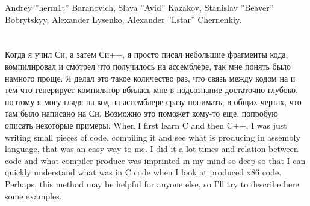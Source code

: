 \documentclass[11pt,a4paper,oneside]{book}
\begin{document}
{Andrey ''herm1t'' Baranovich, Slava ''Avid'' Kazakov, Stanislav ''Beaver'' Bobrytskyy, Alexander Lysenko, 
Alexander ''Lstar'' Chernenkiy.}

\mainmatter

\chapter{}

\IFRU
{Когда я учил Си, а затем Си++, я просто писал небольшие фрагменты кода, компилировал и смотрел что 
получилось на ассемблере, так мне понять было намного проще. Я делал это такое количество раз, 
что связь между кодом на \CCpp и тем что генерирует компилятор вбилась мне в подсознание достаточно 
глубоко, поэтому я могу глядя на код на ассемблере сразу понимать, в общих чертах, что там было написано 
на Си. Возможно это поможет кому-то еще, попробую описать некоторые примеры.}
{When I first learn C and then C++, I was just writing small pieces of code, compiling it and see what 
is producing in assembly language, that was an easy way to me. I did it a lot times and relation 
between \CCpp code and what compiler produce was imprinted in my mind so deep so that 
I can quickly understand what was in C code when I look at produced x86 code. 
Perhaps, this method may be helpful for anyone else, so I'll try to describe here some examples.}




























\end{document}
